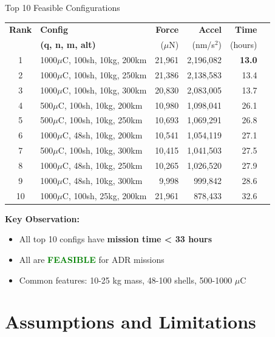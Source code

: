 \documentclass[11pt]{beamer}
\begin{document}
\begin{frame}{Top 10 Feasible Configurations}

\begin{table}[h]
\centering
\footnotesize
\begin{tabular}{clrrrr}
\toprule
\textbf{Rank} & \textbf{Config} & \textbf{Force} & \textbf{Accel} & \textbf{Time} \\
 & \textbf{(q, n, m, alt)} & ($\mu$N) & (nm/s$^2$) & (hours) \\
\midrule
1 & 1000$\mu$C, 100sh, 10kg, 200km & 21,961 & 2,196,082 & \textbf{13.0} \\
2 & 1000$\mu$C, 100sh, 10kg, 250km & 21,386 & 2,138,583 & 13.4 \\
3 & 1000$\mu$C, 100sh, 10kg, 300km & 20,830 & 2,083,005 & 13.7 \\
4 & 500$\mu$C, 100sh, 10kg, 200km & 10,980 & 1,098,041 & 26.1 \\
5 & 500$\mu$C, 100sh, 10kg, 250km & 10,693 & 1,069,291 & 26.8 \\
6 & 1000$\mu$C, 48sh, 10kg, 200km & 10,541 & 1,054,119 & 27.1 \\
7 & 500$\mu$C, 100sh, 10kg, 300km & 10,415 & 1,041,503 & 27.5 \\
8 & 1000$\mu$C, 48sh, 10kg, 250km & 10,265 & 1,026,520 & 27.9 \\
9 & 1000$\mu$C, 48sh, 10kg, 300km & 9,998 & 999,842 & 28.6 \\
10 & 1000$\mu$C, 100sh, 25kg, 200km & 21,961 & 878,433 & 32.6 \\
\bottomrule
\end{tabular}
\end{table}

\vspace{0.2cm}

\textbf{Key Observation:}
\begin{itemize}
\item All top 10 configs have \textbf{mission time < 33 hours}
\item All are \textcolor{green}{\textbf{FEASIBLE}} for ADR missions
\item Common features: 10-25 kg mass, 48-100 shells, 500-1000 $\mu$C
\end{itemize}

\end{frame}

\section{Assumptions and Limitations}
\end{document}
